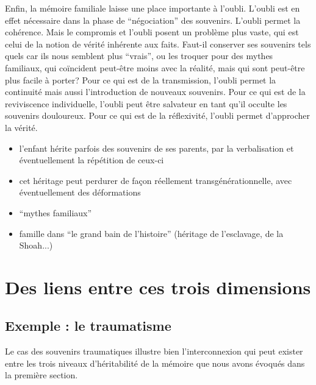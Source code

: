 \documentclass[french]{article}
\begin{document}
			Enfin, la mémoire familiale laisse une place importante à l'oubli. L'oubli est en effet nécessaire dans la phase de ``négociation'' des souvenirs. L'oubli permet la cohérence. Mais le compromis et l'oubli posent un problème plus vaste, qui est celui de la notion de vérité inhérente aux faits. Faut-il conserver ses souvenirs tels quels car ils nous semblent plus ``vrais'', ou les troquer pour des mythes familiaux, qui coïncident peut-être moins avec la réalité, mais qui sont peut-être plus facile à porter? Pour ce qui est de la transmission, l'oubli permet la continuité mais aussi l'introduction de nouveaux souvenirs. Pour ce qui est de la reviviscence individuelle, l'oubli peut être salvateur en tant qu'il occulte les souvenirs douloureux. Pour ce qui est de la réflexivité, l'oubli permet d'approcher la vérité.
		
			
			
			
		\begin{itemize}
			\item l'enfant hérite parfois des souvenirs de ses parents, par la verbalisation et éventuellement la répétition de ceux-ci
			\item cet héritage peut perdurer de façon réellement transgénérationnelle, avec éventuellement des déformations
			\item ``mythes familiaux''
			\item famille dans ``le grand bain de l'histoire'' (héritage de l'esclavage, de la Shoah...)
		\end{itemize}
	\section{Des liens entre ces trois dimensions}
		\subsection{Exemple : le traumatisme}
			Le cas des souvenirs traumatiques illustre bien l'interconnexion qui peut exister entre les trois niveaux d'héritabilité de la mémoire que nous avons évoqués dans la première section.\\
			
\end{document}
